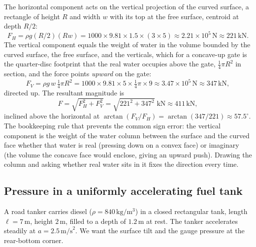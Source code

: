The horizontal component acts on the vertical projection of the curved
surface, a rectangle of height $R$ and width $w$ with its top at the free
surface, centroid at depth $R/2$:
\[
F_H = \rho g (R/2)(R w)
= 1000 \times 9.81 \times 1.5 \times (3 \times 5)
\approx 2.21 \times 10^5\,\text{N}
\approx 221\,\text{kN}.
\]
The vertical component equals the weight of water in the volume bounded by
the curved surface, the free surface, and the verticals, which for a
concave-up gate is the quarter-disc footprint that the real water occupies
above the gate, $\tfrac14 \pi R^2$ in section, and the force points
\emph{upward} on the gate:
\[
F_V = \rho g\, w\, \tfrac14 \pi R^2
= 1000 \times 9.81 \times 5 \times \tfrac14 \pi \times 9
\approx 3.47 \times 10^5\,\text{N}
\approx 347\,\text{kN},
\]
directed up. The resultant magnitude is
\[
F = \sqrt{F_H^2 + F_V^2}
= \sqrt{221^2 + 347^2}\;\text{kN}
\approx 411\,\text{kN},
\]
inclined above the horizontal at $\arctan(F_V/F_H) = \arctan(347/221)
\approx 57.5^{\circ}$. The bookkeeping rule that prevents the common sign
error: the vertical component is the weight of the water column between the
surface and the curved face whether that water is real (pressing down on a
convex face) or imaginary (the volume the concave face would enclose,
giving an upward push). Drawing the column and asking whether real water
sits in it fixes the direction every time.

\subsection{Pressure in a uniformly accelerating fuel tank}

A road tanker carries diesel ($\rho = 840\,\si{\kilogram\per\meter\cubed}$)
in a closed rectangular tank, length $\ell = 7\,\si{\meter}$, height
$2\,\si{\meter}$, filled to a depth of $1.2\,\si{\meter}$ at rest. The
tanker accelerates steadily at $a = 2.5\,\text{m/s}^2$. We want the surface
tilt and the gauge pressure at the rear-bottom corner.

